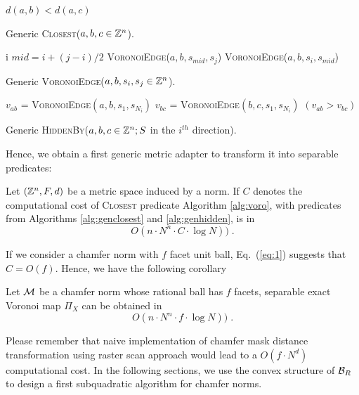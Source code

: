 \documentclass{llncs}
\begin{document}
\begin{algorithm}[H]\small
  \Return $d(a,b) < d(a,c)$\;
  \caption{Generic \textsc{Closest}($a,b,c\in{\mathbb{Z}}^n$).\label{alg:genclosest}}
\end{algorithm}


\begin{algorithm}[H]\small
     {
       \Return  i
     }
     $mid  = i + (j-i)/2$\;
       {
         \Return \textsc{VoronoiEdge}($a,b,s_{mid},s_j$)
}
 {
         \Return \textsc{VoronoiEdge}($a,b,s_{i},s_{mid}$)
}

  \caption{Generic \textsc{VoronoiEdge}($a,b,s_i,s_j\in{\mathbb{Z}}^n$).\label{alg:genedge}}
\end{algorithm}

\begin{algorithm}[H]\small
  $v_{ab}$ = \textsc{VoronoiEdge}$(a,b,s_1, s_{N_i})$\;
  $v_{bc}$ = \textsc{VoronoiEdge}$(b,c,s_1, s_{N_i})$\;
  \Return $(v_{ab}> v_{bc})$\;
  \caption{Generic \textsc{HiddenBy}($a,b,c\in{\mathbb{Z}}^n; S$ in the $i^{th}$
    direction).\label{alg:genhidden}}
\end{algorithm}

Hence, we obtain a first generic metric adapter to transform it into
separable predicates:

\begin{lemma}
\label{lem:generic}
   Let $({\mathbb{Z}}^n, F, d)$ be a metric space induced by a norm. If $C$
   denotes the computational cost of \textsc{Closest} predicate
   Algorithm \ref{alg:voro},  with predicates from Algorithms
   \ref{alg:genclosest} and \ref{alg:genhidden}, is in
  \begin{equation}
    O(n\cdot N^n\cdot C\cdot \log{N}))\;.
  \end{equation}
\end{lemma}

If we consider a chamfer norm with $f$ facet unit ball, Eq.~(\ref{eq:1})
suggests that $C=O(f)$. Hence, we have the following corollary
\begin{corollary}
  Let $\mathcal{M}$ be a chamfer norm whose rational ball has $f$ facets,
  separable exact Voronoi map $\Pi_X$ can be obtained in
 \begin{equation}
    O(n\cdot N^n\cdot f \cdot \log{N}))\;.
  \end{equation}
\end{corollary}

Please remember that naive implementation of chamfer mask distance
transformation using raster scan approach would lead to a $O(f\cdot
N^d)$ computational cost. In the following sections, we use the convex
structure of $\mathcal{B}_R$ to design a first subquadratic algorithm for chamfer
norms.
\end{document}
